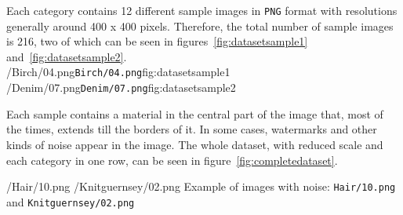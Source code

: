 Each category contains 12 different sample images in \texttt{PNG} format with resolutions generally around 400 x 400 pixels. Therefore, the total number of sample images is 216, two of which can be seen in figures~\ref{fig:datasetsample1} and~\ref{fig:datasetsample2}. \\

\plotTwoImages
{\datasetPath/Birch/04.png}{\texttt{Birch/04.png}}{fig:datasetsample1}
{\datasetPath/Denim/07.png}{\texttt{Denim/07.png}}{fig:datasetsample2}
{}{}

Each sample contains a material in the central part of the image that, most of the times, extends till the borders of it. In some cases, watermarks and other kinds of noise appear in the image. The whole dataset, with reduced scale and each category in one row, can be seen in figure~\ref{fig:completedataset}.

\plotTwoImages
{\datasetPath/Hair/10.png}{}{}
{\datasetPath/Knitguernsey/02.png}{}{}
{Example of images with noise: \texttt{Hair/10.png} and \texttt{Knitguernsey/02.png}}{}

